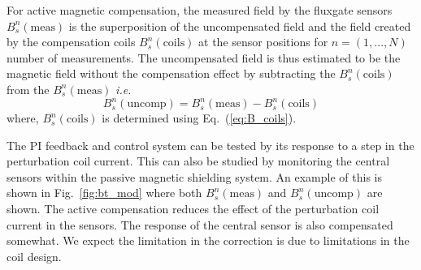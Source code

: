 For active magnetic compensation, the measured field by the fluxgate sensors $B_s^n(\text{meas})$ is the superposition of the uncompensated field and the field created by the compensation coils $B_s^n(\text{coils})$ at the sensor positions for $n=(1,...,N)$ number of measurements. The uncompensated field is thus estimated to be the magnetic field without the compensation effect by subtracting the $B_s^n(\text{coils})$ from the $B_s^n(\text{meas})$ {\it i.e.}
\begin{equation}\label{eq:Buncomp}
     B_s^n(\text{uncomp})=B_s^n(\text{meas})- B_s^n(\text{coils})
\end{equation}
where, $B_s^n(\text{coils})$ is determined using Eq.~(\ref{eq:B_coils}).




The PI feedback and control system can be tested by its response to a step in the perturbation coil current. This can also be studied by monitoring the central sensors within the passive magnetic shielding system. An example of this is shown in Fig.~\ref{fig:bt_mod} where both $B_s^n(\text{meas})$ and $B_s^n(\text{uncomp})$ are shown.  The active compensation reduces the effect of the perturbation coil current in the sensors. The response of the central sensor is also compensated somewhat. We expect the limitation in the correction is due to limitations in the coil design. 



